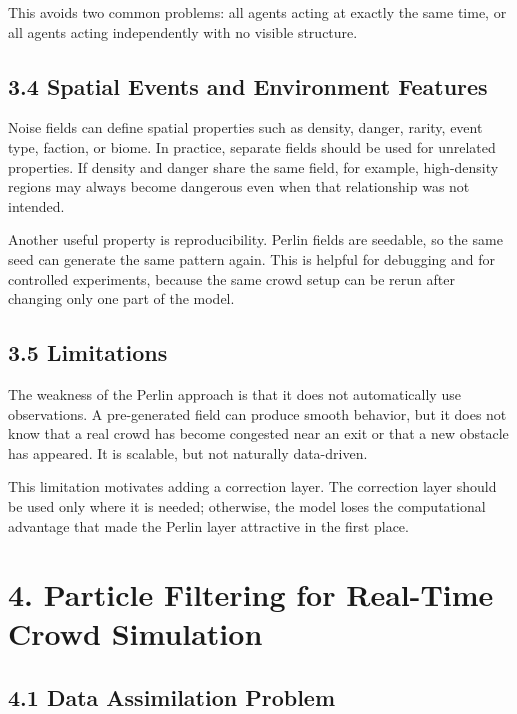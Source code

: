 \documentclass[
  11pt,
]{article}
\begin{document}
This avoids two common problems: all agents acting at exactly the same
time, or all agents acting independently with no visible structure.

\subsection{3.4 Spatial Events and Environment
Features}\label{spatial-events-and-environment-features}

Noise fields can define spatial properties such as density, danger,
rarity, event type, faction, or biome. In practice, separate fields
should be used for unrelated properties. If density and danger share the
same field, for example, high-density regions may always become
dangerous even when that relationship was not intended.

Another useful property is reproducibility. Perlin fields are seedable,
so the same seed can generate the same pattern again. This is helpful
for debugging and for controlled experiments, because the same crowd
setup can be rerun after changing only one part of the model.

\subsection{3.5 Limitations}\label{limitations}

The weakness of the Perlin approach is that it does not automatically
use observations. A pre-generated field can produce smooth behavior, but
it does not know that a real crowd has become congested near an exit or
that a new obstacle has appeared. It is scalable, but not naturally
data-driven.

This limitation motivates adding a correction layer. The correction
layer should be used only where it is needed; otherwise, the model loses
the computational advantage that made the Perlin layer attractive in the
first place.

\section{4. Particle Filtering for Real-Time Crowd
Simulation}\label{particle-filtering-for-real-time-crowd-simulation}

\subsection{4.1 Data Assimilation
Problem}\label{data-assimilation-problem}
\end{document}
